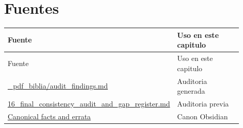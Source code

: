 \section{Fuentes}


\begin{center}
\scriptsize
\begin{longtable}{>{\raggedright\arraybackslash}p{0.455\linewidth} >{\raggedright\arraybackslash}p{0.455\linewidth}}
\toprule
Fuente & Uso en este capitulo \\
\midrule
\endfirsthead
\toprule
Fuente & Uso en este capitulo \\
\midrule
\endhead
\href{file:///E:/Laboral/_pdf_biblia/audit_findings.md}{\_pdf\_biblia/audit\_findings.md} & Auditoria generada \\
\href{file:///E:/Laboral/16_final_consistency_audit_and_gap_register.md}{16\_final\_consistency\_audit\_and\_gap\_register.md} & Auditoria previa \\
\href{file:///E:/Laboral/_obsidian/06_CANONICAL_FACTS_AND_ERRATA.md}{Canonical facts and errata} & Canon Obsidian \\
\bottomrule
\end{longtable}
\end{center}


